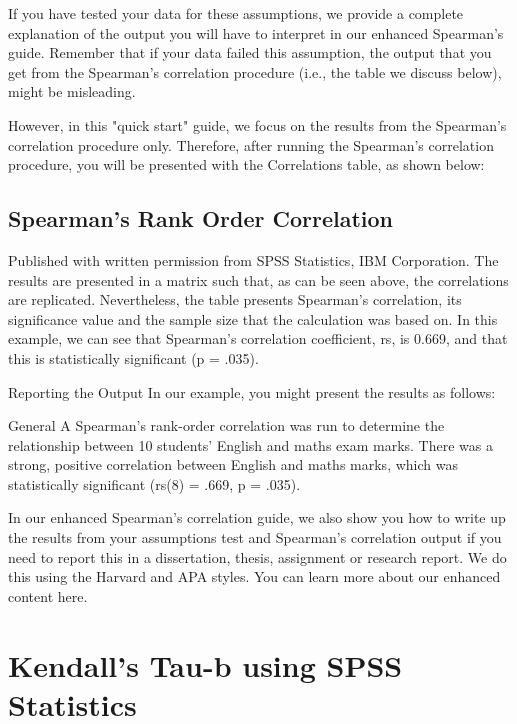 \documentclass[]{article}
\begin{document}
If you have tested your data for these assumptions, we provide a complete explanation of the output you will have to interpret in our enhanced Spearman’s guide. Remember that if your data failed this assumption, the output that you get from the Spearman’s correlation procedure (i.e., the table we discuss below), might be misleading.

However, in this "quick start" guide, we focus on the results from the Spearman’s correlation procedure only. Therefore, after running the Spearman’s correlation procedure, you will be presented with the Correlations table, as shown below:

\subsection{Spearman's Rank Order Correlation}
Published with written permission from SPSS Statistics, IBM Corporation.
The results are presented in a matrix such that, as can be seen above, the correlations are replicated. Nevertheless, the table presents Spearman's correlation, its significance value and the sample size that the calculation was based on. In this example, we can see that Spearman's correlation coefficient, rs, is 0.669, and that this is statistically significant (p = .035).

Reporting the Output
In our example, you might present the results as follows:

General
A Spearman's rank-order correlation was run to determine the relationship between 10 students' English and maths exam marks. There was a strong, positive correlation between English and maths marks, which was statistically significant (rs(8) = .669, p = .035).

In our enhanced Spearman’s correlation guide, we also show you how to write up the results from your assumptions test and Spearman’s correlation output if you need to report this in a dissertation, thesis, assignment or research report. We do this using the Harvard and APA styles. You can learn more about our enhanced content here.




\section{Kendall's Tau-b using SPSS Statistics}
\end{document}
